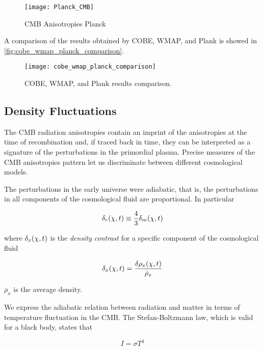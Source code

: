 \begin{figure}
        \centering
        \texttt{[image: Planck\_CMB]}
        \caption{CMB Anisotropies Planck}
        \label{fig:planck_cmb}
\end{figure}

A comparison of the results obtained by COBE, WMAP, and Plank is showed in
\autoref{fig:cobe_wmap_planck_comparison}.

\begin{figure}
        \centering
        \texttt{[image: cobe\_wmap\_planck\_comparison]}
        \caption{COBE, WMAP, and Plank results comparison.}
        \label{fig:cobe_wmap_planck_comparison}
\end{figure}

\subsection{Density Fluctuations}

The CMB radiation anisotropies contain an imprint of the anisotropies at
the time of recombination and, if traced back in time, they can be
interpreted as a signature of the perturbations in the primordial plasma.
Precise measures of the CMB anisotropies pattern let us discriminate
between different cosmological models.

The perturbations in the early universe were adiabatic, that is, the
perturbations in all components of the cosmological fluid are proportional.
In particular

\begin{equation}
        \delta_r\qty(\vb{\chi},t) \equiv \frac{4}{3} \delta_m\qty(\vb{\chi},t)
\end{equation}

where $\delta_x\qty(\vb{\chi},t)$ is the \emph{density contrast} for a
specific component of the cosmological fluid

\begin{equation}
        \delta_x\qty(\vb{\chi},t) = \frac{\var{\rho_x\qty(\vb{\chi},t)}}{\bar \rho_x}
\end{equation}

$\bar \rho_x$ is the average density.

We express the adiabatic relation between radiation and matter in terms of
temperature fluctuation in the CMB. The Stefan-Boltzmann law, which is
valid for a black body, states that

\begin{equation}
        I = \sigma T^4
\end{equation}

